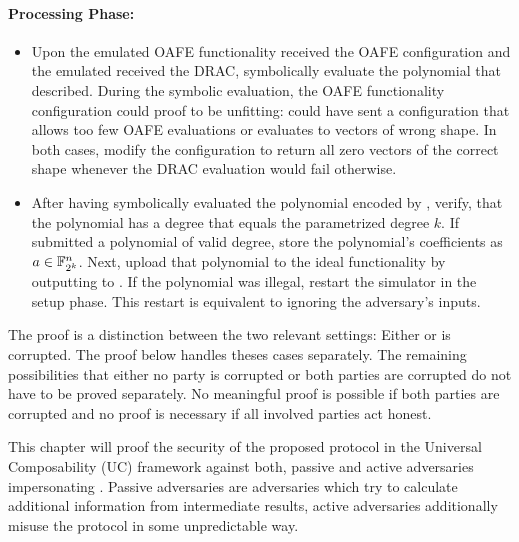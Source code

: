 \paragraph{Processing Phase:}

\begin{itemize}

  \item Upon the emulated OAFE functionality received the OAFE configuration and
    the emulated \JWpTwo{} received the DRAC, symbolically evaluate the
    polynomial that \JWadv{} described. During the symbolic evaluation, the OAFE
    functionality configuration could proof to be unfitting: \JWadv{} could
    have sent a configuration that allows too few OAFE evaluations or evaluates
    to vectors of wrong shape. In both cases, modify the configuration to return
    all zero vectors of the correct shape whenever the DRAC evaluation would
    fail otherwise.

  \item After having symbolically evaluated the polynomial encoded by \JWadv{},
    verify, that the polynomial has a degree that equals the parametrized degree
    $k$. If \JWadv{} submitted a polynomial of valid degree, store the
    polynomial's coefficients as $a \in \mathbb{F}_{2^k}^n$.  Next, upload that
    polynomial to the ideal functionality \JWfuncSymOPEnp{} by outputting
     to \JWfuncSymOPEnp{}.  If the polynomial was illegal,
    restart the simulator in the setup phase.  This restart is equivalent to
    ignoring the adversary's inputs.

\end{itemize}


%
%
\label{sec:proof}

The proof is a distinction between the two relevant settings: Either \JWpOne{}
or \JWpTwo{} is corrupted. The proof below handles theses cases separately. The
remaining possibilities that either no party is corrupted or both parties are
corrupted do not have to be proved separately. No meaningful proof is possible
if both parties are corrupted and no proof is necessary if all involved parties
act honest.



This chapter will proof the security of the proposed protocol \JWprotoSymOPE
in the Universal Composability (UC) framework \cite{canetti05} against both,
passive and active adversaries impersonating \JWpTwo{}. Passive adversaries are
adversaries which try to calculate additional information from intermediate
results, active adversaries additionally misuse the protocol in some
unpredictable way.

